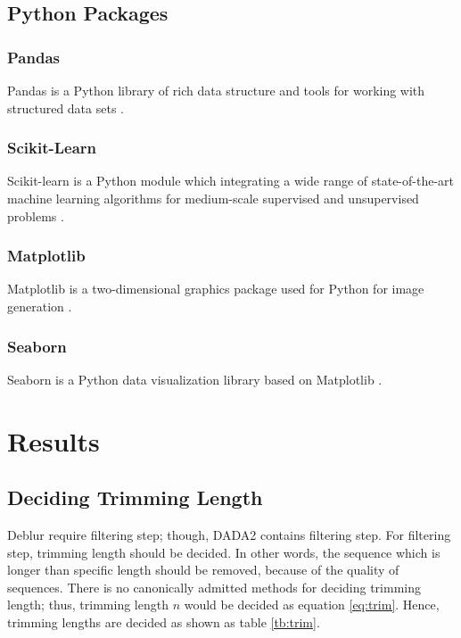 \documentclass[a4paper]{article}
\begin{document}
        \subsection{Python Packages}
            \subsubsection{Pandas}
                Pandas is a Python library of rich data structure and tools for working with structured data sets \cite{pandas1}.

            \subsubsection{Scikit-Learn}
                Scikit-learn is a Python module which integrating a wide range of state-of-the-art machine learning algorithms for medium-scale supervised and unsupervised problems \cite{sklearn1}.

            \subsubsection{Matplotlib}
                Matplotlib is a two-dimensional graphics package used for Python for image generation \cite{matplotlib1}.

            \subsubsection{Seaborn}
                Seaborn is a Python data visualization library based on Matplotlib \cite{seaborn1}.

    \section{Results}
        \subsection{Deciding Trimming Length}
            Deblur require filtering step; though, DADA2 contains filtering step. For filtering step, trimming length should be decided. In other words, the sequence which is longer than specific length should be removed, because of the quality of sequences. There is no canonically admitted methods for deciding trimming length; thus, trimming length $n$ would be decided as equation \ref{eq:trim}. Hence, trimming lengths are decided as shown as table \ref{tb:trim}.
\end{document}
